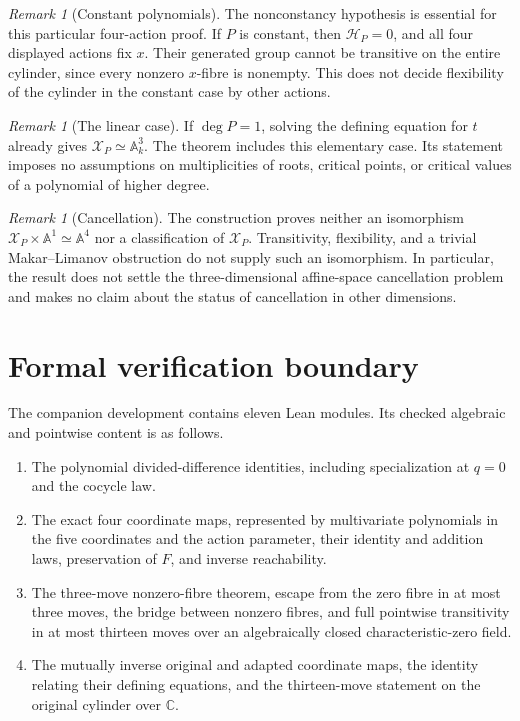 \documentclass[11pt,letterpaper]{article}
\newcommand{\A}{\mathbb A}
\newcommand{\C}{\mathbb C}
\newcommand{\dd}{\mathcal H}
\newcommand{\X}{\mathcal X_P}
\theoremstyle{remark}
\newtheorem{remark}[theorem]{Remark}
\begin{document}
\begin{remark}[Constant polynomials]
The nonconstancy hypothesis is essential for this particular four-action proof. If $P$ is constant, then $\dd_P=0$, and all four displayed actions fix $x$. Their generated group cannot be transitive on the entire cylinder, since every nonzero $x$-fibre is nonempty. This does not decide flexibility of the cylinder in the constant case by other actions.
\end{remark}

\begin{remark}[The linear case]
If $\deg P=1$, solving the defining equation for $t$ already gives $\X\simeq\A^3_k$. The theorem includes this elementary case. Its statement imposes no assumptions on multiplicities of roots, critical points, or critical values of a polynomial of higher degree.
\end{remark}

\begin{remark}[Cancellation]
The construction proves neither an isomorphism $\X\times\A^1\simeq\A^4$ nor a classification of $\X$. Transitivity, flexibility, and a trivial Makar--Limanov obstruction do not supply such an isomorphism. In particular, the result does not settle the three-dimensional affine-space cancellation problem and makes no claim about the status of cancellation in other dimensions.
\end{remark}

\section{Formal verification boundary}\label{sec:formal}

The companion development contains eleven Lean modules. Its checked algebraic and pointwise content is as follows.
\begin{enumerate}[label=\arabic*.,leftmargin=2em,itemsep=0.25em]
\item The polynomial divided-difference identities, including specialization at $q=0$ and the cocycle law.
\item The exact four coordinate maps, represented by multivariate polynomials in the five coordinates and the action parameter, their identity and addition laws, preservation of $F$, and inverse reachability.
\item The three-move nonzero-fibre theorem, escape from the zero fibre in at most three moves, the bridge between nonzero fibres, and full pointwise transitivity in at most thirteen moves over an algebraically closed characteristic-zero field.
\item The mutually inverse original and adapted coordinate maps, the identity relating their defining equations, and the thirteen-move statement on the original cylinder over $\C$.
\end{enumerate}
\end{document}
